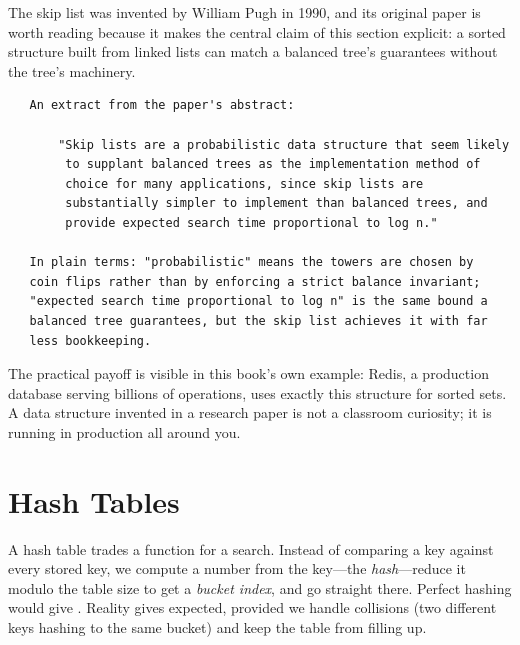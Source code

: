 \begin{researchnote}
The skip list was invented by William Pugh in 1990, and its original
paper is worth reading because it makes the central claim of this
section explicit: a sorted structure built from linked lists can match
a balanced tree's guarantees without the tree's machinery.

\begin{verbatim}
   An extract from the paper's abstract:

       "Skip lists are a probabilistic data structure that seem likely
        to supplant balanced trees as the implementation method of
        choice for many applications, since skip lists are
        substantially simpler to implement than balanced trees, and
        provide expected search time proportional to log n."

   In plain terms: "probabilistic" means the towers are chosen by
   coin flips rather than by enforcing a strict balance invariant;
   "expected search time proportional to log n" is the same bound a
   balanced tree guarantees, but the skip list achieves it with far
   less bookkeeping.
\end{verbatim}

The practical payoff is visible in this book's own example: Redis, a
production database serving billions of operations, uses exactly this
structure for sorted sets. A data structure invented in a research
paper is not a classroom curiosity; it is running in production all
around you.

\end{researchnote}

\section{Hash Tables}

A hash table trades a function for a search. Instead of comparing a key
against every stored key, we compute a number from the key---the
\emph{hash}---reduce it modulo the table size to get a \emph{bucket
index}, and go straight there. Perfect hashing would give
. Reality gives  expected, provided we handle
collisions (two different keys hashing to the same bucket) and keep the
table from filling up.

